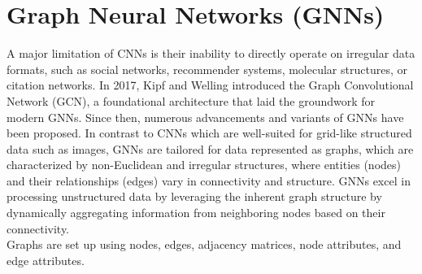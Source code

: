\section{Graph Neural Networks (GNNs)} \label{gnnse}
A major limitation of CNNs is their inability to directly operate on irregular data formats, such as social networks, recommender systems, molecular structures, or citation networks. In 2017, Kipf and Welling \cite{kipf} introduced the Graph Convolutional Network (GCN), a foundational architecture that laid the groundwork for modern GNNs. Since then, numerous advancements and variants of GNNs have been proposed. In contrast to CNNs which are well-suited for grid-like structured data such as images, GNNs are tailored for data represented as graphs, which are characterized by non-Euclidean and irregular structures, where entities (nodes) and their relationships (edges) vary in connectivity and structure. GNNs excel in processing unstructured data by leveraging the inherent graph structure by dynamically aggregating information from neighboring nodes based on their connectivity. \\
Graphs are set up using nodes, edges, adjacency matrices, node attributes, and edge attributes. 
